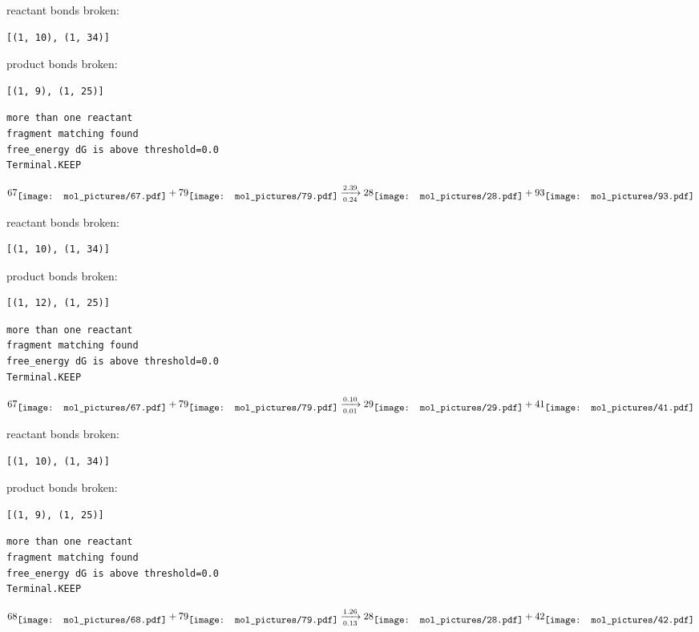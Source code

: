 \documentclass{article}
\begin{document}
reactant bonds broken:\begin{verbatim}
[(1, 10), (1, 34)]
\end{verbatim}
product bonds broken:\begin{verbatim}
[(1, 9), (1, 25)]
\end{verbatim}




\vspace{1cm}
\begin{verbatim}
more than one reactant
fragment matching found
free_energy dG is above threshold=0.0
Terminal.KEEP
\end{verbatim}
$$
67
\raisebox{-.5\height}{\texttt{[image: mol\_pictures/67.pdf]}}
+
79
\raisebox{-.5\height}{\texttt{[image: mol\_pictures/79.pdf]}}
\xrightarrow[0.24]{2.39}
28
\raisebox{-.5\height}{\texttt{[image: mol\_pictures/28.pdf]}}
+
93
\raisebox{-.5\height}{\texttt{[image: mol\_pictures/93.pdf]}}
$$


reactant bonds broken:\begin{verbatim}
[(1, 10), (1, 34)]
\end{verbatim}
product bonds broken:\begin{verbatim}
[(1, 12), (1, 25)]
\end{verbatim}




\vspace{1cm}
\begin{verbatim}
more than one reactant
fragment matching found
free_energy dG is above threshold=0.0
Terminal.KEEP
\end{verbatim}
$$
67
\raisebox{-.5\height}{\texttt{[image: mol\_pictures/67.pdf]}}
+
79
\raisebox{-.5\height}{\texttt{[image: mol\_pictures/79.pdf]}}
\xrightarrow[0.01]{0.10}
29
\raisebox{-.5\height}{\texttt{[image: mol\_pictures/29.pdf]}}
+
41
\raisebox{-.5\height}{\texttt{[image: mol\_pictures/41.pdf]}}
$$


reactant bonds broken:\begin{verbatim}
[(1, 10), (1, 34)]
\end{verbatim}
product bonds broken:\begin{verbatim}
[(1, 9), (1, 25)]
\end{verbatim}




\vspace{1cm}
\begin{verbatim}
more than one reactant
fragment matching found
free_energy dG is above threshold=0.0
Terminal.KEEP
\end{verbatim}
$$
68
\raisebox{-.5\height}{\texttt{[image: mol\_pictures/68.pdf]}}
+
79
\raisebox{-.5\height}{\texttt{[image: mol\_pictures/79.pdf]}}
\xrightarrow[0.13]{1.26}
28
\raisebox{-.5\height}{\texttt{[image: mol\_pictures/28.pdf]}}
+
42
\raisebox{-.5\height}{\texttt{[image: mol\_pictures/42.pdf]}}
$$
\end{document}
